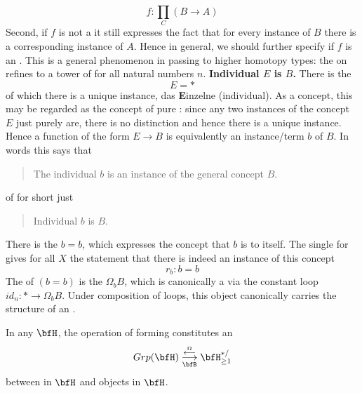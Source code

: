\begin{displaymath}
f\colon \underset{C}{\prod} (B \longrightarrow A)
\end{displaymath}
Second, if $f$ is not a  it still expresses the fact that for every instance of $B$ there is a corresponding instance of $A$. Hence in general, we should further specify if $f$ is an . This is a general phenomenon in passing to higher homotopy types: the  on  refines to a tower of  for all natural numbers $n$.
\textbf{Individual $E$ is $B$.}
There is the 
\begin{displaymath}
E = \ast
\end{displaymath}
of which there is a unique instance, das \textbf{E}inzelne (individual). As a concept, this may be regarded as the concept of pure : since any two instances of the concept $E$ just purely are, there is no distinction and hence there is a unique instance.
Hence a function of the form $E \longrightarrow B$ is equivalently an instance/term $b$ of $B$. In words this says that
\begin{quote}%
The individual $b$ is an instance of the general concept $B$.
\end{quote}
of for short just
\begin{quote}%
Individual $b$ is $B$.
\end{quote}
There is the  $b = b$, which expresses the concept that $b$ is  to itself.
The single  for  gives for all $X$ the statement that there is indeed an instance of this concept
\begin{displaymath}
r_b \colon b = b
\end{displaymath}
The  of $(b = b)$ is the  $\Omega_b B$, which is canonically a  via the constant loop $id_n \colon \ast \to \Omega_b B$.
Under composition of loops, this object canonically carries the structure of an .
\begin{prop}
\label{LoopingDeloopingTheorem}\hypertarget{LoopingDeloopingTheorem}{}
In any  $\bfH$, the operation of forming  constitutes an 
\begin{displaymath}
Grp(\bfH)
\stackrel{\overset{\Omega}{\longleftarrow}}{\underset{\bfB}{\longrightarrow}}
\bfH^{\ast/}_{\geq 1}
\end{displaymath}
between  in $\bfH$ and   objects in $\bfH$.
\end{prop}
